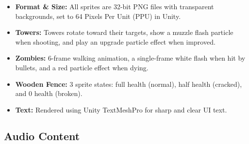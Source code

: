 \begin{itemize}[label=\textbullet]
  \item \textbf{Format \& Size:} All sprites are 32-bit PNG files with transparent backgrounds, set to 64 Pixels Per Unit (PPU) in Unity.
  \item \textbf{Towers:} Towers rotate toward their targets, show a muzzle flash particle when shooting, and play an upgrade particle effect when improved.
  \item \textbf{Zombies:} 6-frame walking animation, a single-frame white flash when hit by bullets, and a red particle effect when dying.
  \item \textbf{Wooden Fence:} 3 sprite states: full health (normal), half health (cracked), and 0 health (broken).
  \item \textbf{Text:} Rendered using Unity TextMeshPro for sharp and clear UI text.
\end{itemize}

\subsection{Audio Content}

